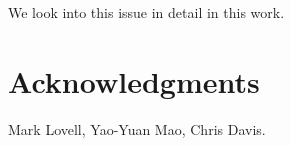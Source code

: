 \documentclass[aps,prd,10pt,twocolumn,superscriptaddress,showpacs]{revtex4-1}
\begin{document}
We look into this issue in detail in this work.

 
\vspace{-0.5 cm}
	

\section*{Acknowledgments} 

Mark Lovell, Yao-Yuan Mao, Chris Davis.


\newcommand{\mnras}[0]{M.N.R.A.S.}
%
%	
	
\end{document}
